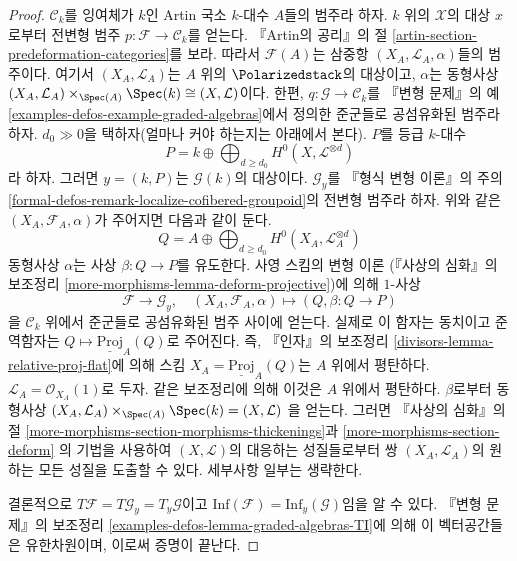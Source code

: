 \begin{proof}
\medskip\noindent
$\mathcal{C}_k$를 잉여체가 $k$인 Artin 국소 $k$-대수 $A$들의 범주라 하자.
$k$ 위의 $\mathcal{X}$의 대상 $x$로부터 전변형 범주
$p : \mathcal{F} \to \mathcal{C}_k$를 얻는다. 『Artin의 공리』의 절
\ref{artin-section-predeformation-categories}를 보라. 따라서
$\mathcal{F}(A)$는 삼중항 $(X_A, \mathcal{L}_A, \alpha)$들의 범주이다.
여기서 $(X_A, \mathcal{L}_A)$는 $A$ 위의 $\Polarizedstack$의 대상이고,
$\alpha$는 동형사상
$(X_A, \mathcal{L}_A) \times_{\Spec(A)} \Spec(k) \cong (X, \mathcal{L})$이다.
한편, $q : \mathcal{G} \to \mathcal{C}_k$를 『변형 문제』의 예
\ref{examples-defos-example-graded-algebras}에서 정의한 준군들로 공섬유화된
범주라 하자. $d_0 \gg 0$을 택하자(얼마나 커야 하는지는 아래에서 본다).
$P$를 등급 $k$-대수
$$
P = k \oplus \bigoplus\nolimits_{d \geq d_0} H^0(X, \mathcal{L}^{\otimes d})
$$
라 하자. 그러면 $y = (k, P)$는 $\mathcal{G}(k)$의 대상이다.
$\mathcal{G}_y$를 『형식 변형 이론』의 주의
\ref{formal-defos-remark-localize-cofibered-groupoid}의 전변형 범주라 하자.
위와 같은 $(X_A, \mathcal{F}_A, \alpha)$가 주어지면 다음과 같이 둔다.
$$
Q = A \oplus \bigoplus\nolimits_{d \geq d_0} H^0(X_A, \mathcal{L}_A^{\otimes d})
$$
동형사상 $\alpha$는 사상 $\beta : Q \to P$를 유도한다. 사영 스킴의 변형 이론
(『사상의 심화』의 보조정리 \ref{more-morphisms-lemma-deform-projective})에 의해
$1$-사상
$$
\mathcal{F} \longrightarrow \mathcal{G}_y,\quad
(X_A, \mathcal{F}_A, \alpha) \longmapsto (Q, \beta : Q \to P)
$$
을 $\mathcal{C}_k$ 위에서 준군들로 공섬유화된 범주 사이에 얻는다.
실제로 이 함자는 동치이고 준역함자는
$Q \mapsto \underline{\text{Proj}}_A(Q)$로 주어진다. 즉, 『인자』의 보조정리
\ref{divisors-lemma-relative-proj-flat}에 의해 스킴
$X_A = \underline{\text{Proj}}_A(Q)$는 $A$ 위에서 평탄하다.
$\mathcal{L}_A = \mathcal{O}_{X_A}(1)$로 두자. 같은 보조정리에 의해 이것은
$A$ 위에서 평탄하다. $\beta$로부터 동형사상
$(X_A, \mathcal{L}_A) \times_{\Spec(A)} \Spec(k) = (X, \mathcal{L})$
을 얻는다. 그러면 『사상의 심화』의 절
\ref{more-morphisms-section-morphisms-thickenings}과
\ref{more-morphisms-section-deform}
의 기법을 사용하여 $(X, \mathcal{L})$의 대응하는 성질들로부터 쌍
$(X_A, \mathcal{L}_A)$의 원하는 모든 성질을 도출할 수 있다. 세부사항 일부는
생략한다.

\medskip\noindent
결론적으로 $T\mathcal{F} = T\mathcal{G}_y = T_y\mathcal{G}$이고
$\text{Inf}(\mathcal{F}) = \text{Inf}_y(\mathcal{G})$임을 알 수 있다.
『변형 문제』의 보조정리 \ref{examples-defos-lemma-graded-algebras-TI}에 의해
이 벡터공간들은 유한차원이며, 이로써 증명이 끝난다.
\end{proof}

